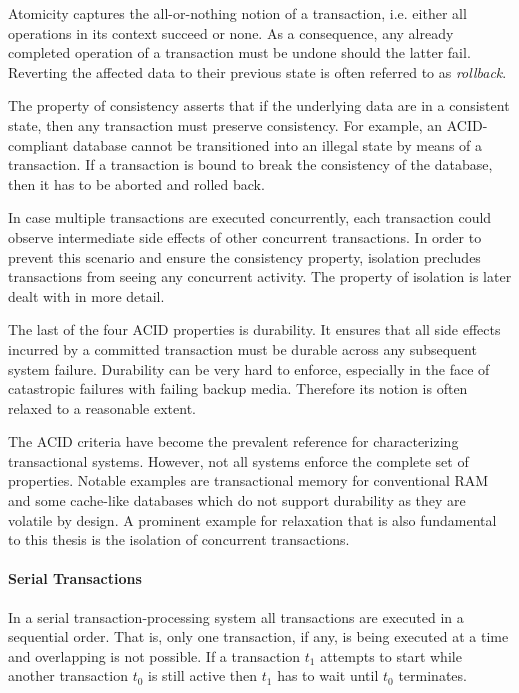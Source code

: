 Atomicity captures the all-or-nothing notion of a transaction, i.e. either all
operations in its context succeed or none. As a consequence, any already
completed operation of a transaction must be undone should the latter fail.
Reverting the affected data to their previous state is often referred to as
\emph{rollback}.

The property of consistency asserts that if the underlying data are in a
consistent state, then any transaction must preserve consistency. For example,
an ACID-compliant database cannot be transitioned into an illegal state by means
of a transaction. If  a transaction is bound to break the consistency of the
database, then it has to be aborted and rolled back.

In case multiple transactions are executed concurrently, each transaction could
observe intermediate side effects of other concurrent transactions. In order to
prevent this scenario and ensure the consistency property, isolation precludes
transactions from seeing any concurrent activity. The property of isolation is
later dealt with in more detail.

The last of the four ACID properties is durability. It ensures that all side
effects incurred by a committed transaction must be durable across any
subsequent system failure. Durability can be very hard to enforce, especially in
the face of catastropic failures with failing backup media. Therefore its notion
is often relaxed to a reasonable extent.

The ACID criteria have become the prevalent reference for characterizing
transactional systems. However, not all systems enforce the complete set of
properties. Notable examples are transactional memory for conventional RAM and
some cache-like databases which do not support durability as they are volatile
by design. A prominent example for relaxation that is also fundamental to this thesis is the isolation of concurrent transactions.

\paragraph{Serial Transactions}

In a serial transaction-processing system all transactions are executed in a
sequential order. That is, only one transaction, if any, is being executed at a
time and overlapping is not possible. If a transaction $t_1$ attempts to start
while another transaction $t_0$ is still active then $t_1$ has to wait until
$t_0$ terminates.

